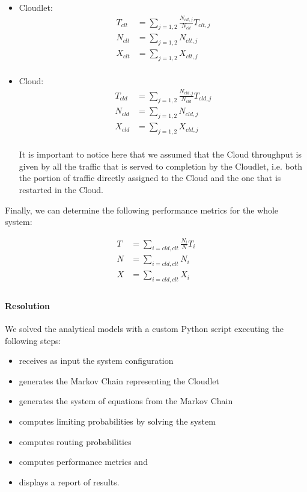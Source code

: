 \begin{itemize}
	\item Cloudlet:
	\begin{equation} 
	\begin{split}
		T_{clt} &= \sum_{j=1,2} \frac{N_{clt,j}} {N_{clt}} T_{clt,j} \\
		N_{clt} &= \sum_{j=1,2} N_{clt,j} \\
		X_{clt} &= \sum_{j=1,2} X_{clt,j} \\
	\end{split}
	\end{equation}
	
	\item Cloud:
	\begin{equation} 
	\begin{split}
		T_{cld} &= \sum_{j=1,2} \frac{N_{cld,j}} {N_{cld}} T_{cld,j} \\
		N_{cld} &= \sum_{j=1,2} N_{cld,j} \\
		X_{cld} &= \sum_{j=1,2} X_{cld,j} \\
	\end{split}
	\end{equation}

	It is important to notice here that we assumed that the Cloud throughput is given by all the traffic that is served to completion by the Cloudlet, i.e. both the portion of traffic directly assigned to the Cloud and the one that is restarted in the Cloud.
	\end{itemize}

Finally, we can determine the following performance metrics for the whole system:

\begin{equation} 
\begin{split}
	T &= \sum_{i=cld,clt} \frac{N_{i}} {N} T_{i} \\
	N &= \sum_{i=cld,clt} N_{i} \\
	X &= \sum_{i=cld,clt} X_{i} \\
\end{split}
\end{equation}


\paragraph{Resolution}
We solved the analytical models with a custom Python script executing the following steps:

\begin{itemize}
\item receives as input the system configuration
\item  generates the Markov Chain representing the Cloudlet
\item  generates the system of equations from the Markov Chain
\item  computes limiting probabilities by solving the system
\item  computes routing probabilities
\item  computes performance metrics and
\item  displays a report of results.
\end{itemize} 


